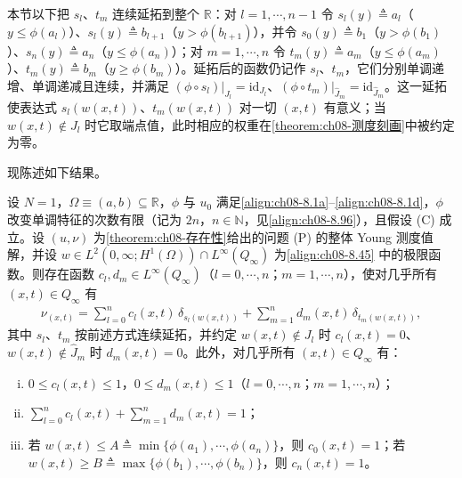 \documentclass[../../main.tex]{subfiles}%
\begin{document}
本节以下把 $s_l$、$t_m$ 连续延拓到整个 $\mathbb{R}$：对 $l=1,\cdots ,n-1$ 令 $s_l(y)\triangleq a_l$（$y\leqslant\phi(a_l)$）、$s_l(y)\triangleq b_{l+1}$（$y>\phi(b_{l+1})$），并令 $s_0(y)\triangleq b_1$（$y>\phi(b_1)$）、$s_n(y)\triangleq a_n$（$y\leqslant\phi(a_n)$）；对 $m=1,\cdots ,n$ 令 $t_m(y)\triangleq a_m$（$y\leqslant\phi(a_m)$）、$t_m(y)\triangleq b_m$（$y\geqslant\phi(b_m)$）。延拓后的函数仍记作 $s_l$、$t_m$，它们分别单调递增、单调递减且连续，并满足 $(\phi\circ s_l)|_{J_l}=\mathrm{id}_{J_l}$、$(\phi\circ t_m)|_{\widehat J_m}=\mathrm{id}_{\widehat J_m}$。这一延拓使表达式 $s_l(w(x,t))$、$t_m(w(x,t))$ 对一切 $(x,t)$ 有意义；当 $w(x,t)\notin J_l$ 时它取端点值，此时相应的权重在\cref{theorem:ch08-测度刻画}中被约定为零。

现陈述如下结果。

\begin{theorem}\label{theorem:ch08-测度刻画}
设 $N=1$，$\Omega\equiv(a,b)\subseteq\mathbb{R}$，$\phi$ 与 $u_0$ 满足\eqref{align:ch08-8.1a}--\eqref{align:ch08-8.1d}，$\phi$ 改变单调特征的次数有限（记为 $2n$，$n\in\mathbb{N}$，见\eqref{align:ch08-8.96}），且假设 (C) 成立。设 $(u,\nu)$ 为\cref{theorem:ch08-存在性}给出的问题 (P) 的整体 Young 测度值解，并设 $w\in L^2(0,\infty;H^1(\Omega))\cap L^\infty(Q_\infty)$ 为\eqref{align:ch08-8.45} 中的极限函数。则存在函数 $c_l,d_m\in L^\infty(Q_\infty)$（$l=0,\cdots ,n$；$m=1,\cdots ,n$），使对几乎所有 $(x,t)\in Q_\infty$ 有
\begin{align}
\nu_{(x,t)}=\sum_{l=0}^n c_l(x,t)\,\delta_{s_l(w(x,t))}
+\sum_{m=1}^n d_m(x,t)\,\delta_{t_m(w(x,t))}, \label{align:ch08-8.97}
\end{align}
其中 $s_l$、$t_m$ 按前述方式连续延拓，并约定 $w(x,t)\notin J_l$ 时 $c_l(x,t)=0$、$w(x,t)\notin\widehat J_m$ 时 $d_m(x,t)=0$。此外，对几乎所有 $(x,t)\in Q_\infty$ 有：
\begin{enumerate}[(i)]
\item\label{item:ch08-char-i} $0\leqslant c_l(x,t)\leqslant1$，$0\leqslant d_m(x,t)\leqslant1$（$l=0,\cdots ,n$；$m=1,\cdots ,n$）；
\item\label{item:ch08-char-ii} $\sum_{l=0}^n c_l(x,t)+\sum_{m=1}^n d_m(x,t)=1$；
\item\label{item:ch08-char-iii} 若 $w(x,t)\leqslant A\triangleq\min\{\phi(a_1),\cdots ,\phi(a_n)\}$，则 $c_0(x,t)=1$；若 $w(x,t)\geqslant B\triangleq\max\{\phi(b_1),\cdots ,\phi(b_n)\}$，则 $c_n(x,t)=1$。
\end{enumerate}
\end{theorem}
\end{document}
